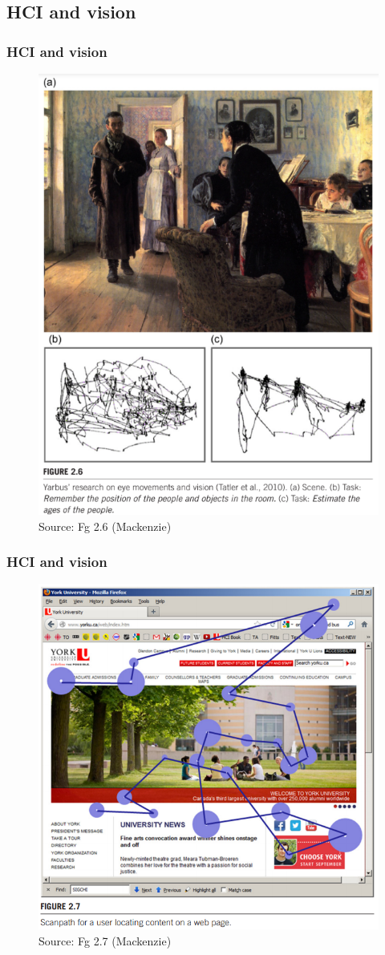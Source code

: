 \documentclass{beamer}
\begin{document}

\subsection{HCI and vision}

\begin{frame}
	\frametitle{HCI and vision}
	\begin{figure}
		\includegraphics[width=0.4\linewidth]{image/2-6}
		\caption{Source: Fg 2.6 (Mackenzie)}
	\end{figure}
\end{frame}

\begin{frame}
	\frametitle{HCI and vision}
	\begin{figure}
		\includegraphics[width=0.6\linewidth]{image/2-7}
		\caption{Source: Fg 2.7 (Mackenzie)}
	\end{figure}
\end{frame}
\end{document}
